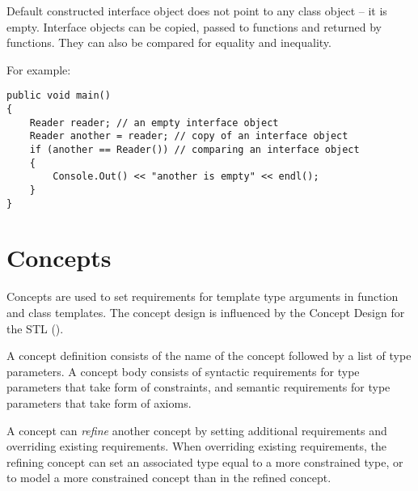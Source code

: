 \documentclass[a4paper,oneside,11pt]{article}
\begin{document}
Default constructed interface object does not point to any class object -- it is empty.
Interface objects can be copied, passed to functions and returned by functions.
They can also be compared for equality and inequality.

For example:

\begin{lstlisting}[frame=trBL]
public void main()
{
    Reader reader; // an empty interface object
    Reader another = reader; // copy of an interface object
    if (another == Reader()) // comparing an interface object
    {
        Console.Out() << "another is empty" << endl();
    }
}
\end{lstlisting}

\section{Concepts}\label{conceptdefinition}\label{conceptname}

Concepts are used to set requirements for template type arguments in function and class templates.
The concept design is influenced by the Concept Design for the STL (\cite{STLCONCEPTS}).

A concept definition consists of the name of the concept followed by a list of type parameters.
A concept body consists of syntactic requirements for type parameters that take form of constraints,
and semantic requirements for type parameters that take form of axioms.

A concept can \emph{refine} another concept by setting additional requirements and overriding existing requirements.
When overriding existing requirements, the refining concept can set an associated type equal to a more constrained type,
or to model a more constrained concept than in the refined concept.
\end{document}
